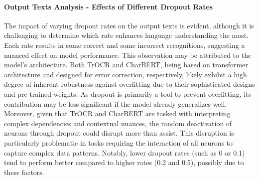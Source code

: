 
\paragraph*{Output Texts Analysis - Effects of Different Dropout Rates}
The impact of varying dropout rates on the output texts is evident, although it is challenging to determine which rate enhances language understanding the most. Each rate results in some correct and some incorrect recognitions, suggesting a nuanced effect on model performance. This observation may be attributed to the model's architecture. Both TrOCR and CharBERT, being based on transformer architecture and designed for error correction, respectively, likely exhibit a high degree of inherent robustness against overfitting due to their sophisticated designs and pre-trained weights. As dropout is primarily a tool to prevent overfitting, its contribution may be less significant if the model already generalizes well. Moreover, given that TrOCR and CharBERT are tasked with interpreting complex dependencies and contextual nuances, the random deactivation of neurons through dropout could disrupt more than assist. This disruption is particularly problematic in tasks requiring the interaction of all neurons to capture complex data patterns. Notably, lower dropout rates (such as 0 or 0.1) tend to perform better compared to higher rates (0.2 and 0.5), possibly due to these factors.


